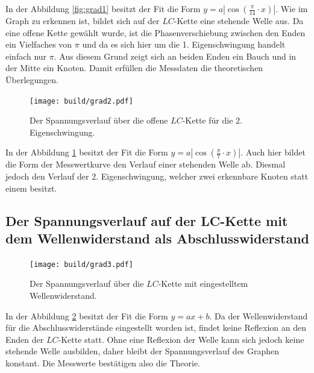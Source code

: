 \hspace{1.8ex} In der Abbildung \ref{fig:grad1} besitzt der Fit die Form $y = a  |\cos(\frac{\pi}{14} \cdot x)|$. Wie im Graph zu erkennen ist, bildet sich auf der $LC$-Kette eine stehende Welle aus.
 Da eine offene Kette gewählt wurde, ist die Phasenverschiebung zwischen den Enden ein Vielfaches
  von $\pi$ und da es sich hier um die 1. Eigenschwingung handelt einfach nur $\pi$. Aus diesem Grund zeigt
 sich an beiden Enden ein Bauch und in der Mitte ein Knoten. Damit erfüllen die Messdaten die theoretischen Überlegungen.
\begin{figure}[H]
	\centering
	\caption{Der Spannungsverlauf über die offene $LC$-Kette für die 2. Eigenschwingung.}
	\texttt{[image: build/grad2.pdf]}
	\label{fig:grad2}
\end{figure}
In der Abbildung \ref{fig:grad2} besitzt der Fit die Form $y = a  |\cos(\frac{\pi}{7} \cdot x)|$. Auch hier bildet die Form der Messwertkurve den Verlauf einer stehenden Welle ab. Diesmal jedoch den Verlauf der 2. Eigenschwingung, welcher zwei erkennbare Knoten statt einem besitzt.

\subsection{Der Spannungsverlauf auf der LC-Kette mit dem Wellenwiderstand als Abschlusswiderstand}
\begin{figure}[H]
	\centering
	\caption{Der Spannungsverlauf über die $LC$-Kette mit eingestelltem Wellenwiderstand.}
	\texttt{[image: build/grad3.pdf]}
	\label{fig:grad3}
\end{figure}

In der Abbildung \ref{fig:grad3} besitzt der Fit die Form $y = a  x + b$. Da der Wellenwiderstand für die Abschlusswiderstände eingestellt worden ist, findet keine Reflexion an den Enden der $LC$-Kette statt. Ohne eine Reflexion der Welle kann sich jedoch keine stehende Welle ausbilden, daher bleibt der Spannungsverlauf des Graphen konstant. Die Messwerte bestätigen also die Theorie.
